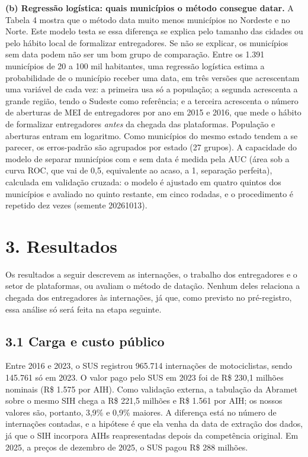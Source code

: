 \documentclass[
  11pt,
]{article}
\begin{document}
\textbf{(b) Regressão logística: quais municípios o método consegue datar.} A Tabela 4 mostra que o método data muito menos municípios no Nordeste e no Norte. Este modelo testa se essa diferença se explica pelo tamanho das cidades ou pelo hábito local de formalizar entregadores. Se não se explicar, os municípios sem data podem não ser um bom grupo de comparação. Entre os 1.391 municípios de 20 a 100 mil habitantes, uma regressão logística estima a probabilidade de o município receber uma data, em três versões que acrescentam uma variável de cada vez: a primeira usa só a população; a segunda acrescenta a grande região, tendo o Sudeste como referência; e a terceira acrescenta o número de aberturas de MEI de entregadores por ano em 2015 e 2016, que mede o hábito de formalizar entregadores \emph{antes} da chegada das plataformas. População e aberturas entram em logaritmo. Como municípios do mesmo estado tendem a se parecer, os erros-padrão são agrupados por estado (27 grupos). A capacidade do modelo de separar municípios com e sem data é medida pela AUC (área sob a curva ROC, que vai de 0,5, equivalente ao acaso, a 1, separação perfeita), calculada em validação cruzada: o modelo é ajustado em quatro quintos dos municípios e avaliado no quinto restante, em cinco rodadas, e o procedimento é repetido dez vezes (semente 20261013).

\hypertarget{resultados}{%
\section{3. Resultados}\label{resultados}}

Os resultados a seguir descrevem as internações, o trabalho dos entregadores e o setor de plataformas, ou avaliam o método de datação. Nenhum deles relaciona a chegada dos entregadores às internações, já que, como previsto no pré-registro, essa análise só será feita na etapa seguinte.

\hypertarget{carga-e-custo-puxfablico}{%
\subsection{3.1 Carga e custo público}\label{carga-e-custo-puxfablico}}

Entre 2016 e 2023, o SUS registrou 965.714 internações de motociclistas, sendo 145.761 só em 2023. O valor pago pelo SUS em 2023 foi de R\$ 230,1 milhões nominais (R\$ 1.575 por AIH). Como validação externa, a tabulação da Abramet sobre o mesmo SIH chega a R\$ 221,5 milhões e R\$ 1.561 por AIH; os nossos valores são, portanto, 3,9\% e 0,9\% maiores. A diferença está no número de internações contadas, e a hipótese é que ela venha da data de extração dos dados, já que o SIH incorpora AIHs reapresentadas depois da competência original. Em 2025, a preços de dezembro de 2025, o SUS pagou R\$ 288 milhões.
\end{document}
